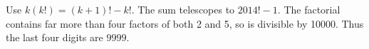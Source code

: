 Use $k(k!)=(k+1)!-k!$. The sum telescopes to $2014!-1$. The factorial contains far more than four factors of both 2 and 5, so is divisible by 10000. Thus the last four digits are $\boxed{9999}$.
